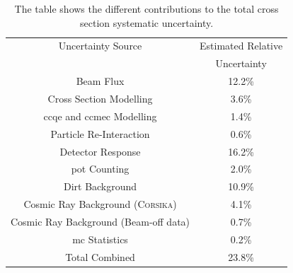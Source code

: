 \begin{table}[]
\centering
\caption[Summary of Systematic Uncertainties]{The table shows the different contributions to the total cross section systematic uncertainty.}
\label{tab:all_syst}
\begin{tabular}{c c}
\toprule
Uncertainty Source         & Estimated Relative     \\
                           & Uncertainty     \\
\midrule
Beam Flux                 &  12.2\%       \\
Cross Section Modelling   &  3.6\%        \\
\acrshort{cc}\acrshort{qe} and \acrshort{cc}\acrshort{mec} Modelling               &  1.4\%        \\
Particle Re-Interaction   &  0.6\%        \\
Detector Response         &  16.2\%       \\
\acrshort{pot} Counting   &  2.0\%          \\
Dirt Background           &  10.9\%        \\
Cosmic Ray Background (\textsc{Corsika})         &  4.1\%        \\
Cosmic Ray Background (Beam-off data)     &  0.7\%        \\
\acrshort{mc} Statistics  &  0.2\%        \\
\midrule
Total Combined            &  23.8\%       \\
\bottomrule
\end{tabular}
\end{table}


